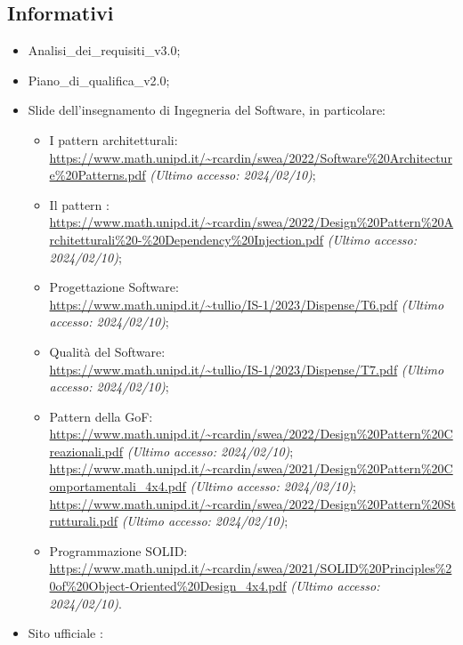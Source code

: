 \subsection{Informativi}
\begin{itemize}
    \item Analisi\_dei\_requisiti\_v3.0;
    \item Piano\_di\_qualifica\_v2.0;
    \item Slide dell’insegnamento di Ingegneria del Software, in particolare:
        \begin{itemize}
            \item I pattern architetturali: \\ \url{https://www.math.unipd.it/~rcardin/swea/2022/Software%20Architecture%20Patterns.pdf} \textit{(Ultimo accesso: 2024/02/10)};
            \item Il pattern :\\ \url{https://www.math.unipd.it/~rcardin/swea/2022/Design%20Pattern%20Architetturali%20-%20Dependency%20Injection.pdf} \textit{(Ultimo accesso: 2024/02/10)};
            \item Progettazione Software:\\ \url{https://www.math.unipd.it/~tullio/IS-1/2023/Dispense/T6.pdf} \textit{(Ultimo accesso: 2024/02/10)};
            \item Qualità del Software:\\ \url{https://www.math.unipd.it/~tullio/IS-1/2023/Dispense/T7.pdf} \textit{(Ultimo accesso: 2024/02/10)};
            \item Pattern della GoF:\\ \url{https://www.math.unipd.it/~rcardin/swea/2022/Design%20Pattern%20Creazionali.pdf} \textit{(Ultimo accesso: 2024/02/10)};\\
            \url{https://www.math.unipd.it/~rcardin/swea/2021/Design%20Pattern%20Comportamentali_4x4.pdf} \textit{(Ultimo accesso: 2024/02/10)};\\
            \url{https://www.math.unipd.it/~rcardin/swea/2022/Design%20Pattern%20Strutturali.pdf} \textit{(Ultimo accesso: 2024/02/10)};
            \item Programmazione SOLID:\\ \url{https://www.math.unipd.it/~rcardin/swea/2021/SOLID%20Principles%20of%20Object-Oriented%20Design_4x4.pdf} \textit{(Ultimo accesso: 2024/02/10)}.
        \end{itemize}
    \item Sito ufficiale : \\

\end{itemize}
